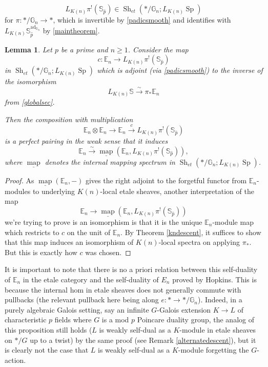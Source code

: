 \documentclass[12pt]{article}
\newtheorem{lemma}[theorem]{Lemma}
\newcommand{\on}{\operatorname}
\newcommand{\mbb}{\mathbb}
\newcommand{\wh}{\widehat}
\begin{document}
$$L_{K(n)}\pi^!(\mbb{S}_{\wh{p}}) \in \on{Sh}_{et}(\ast/\mathbb{G}_n;L_{K(n)}\on{Sp})$$
for $\pi:\ast/\mbb{G}_n\to \ast$, which is invertible by \ref{padicsmooth} and identifies with $L_{K(n)}\mbb{S}_{\wh{p}}^{\on{ad}_{\mbb{G}_n}}$ by \ref{maintheorem}.

\begin{lemma}
Let $p$ be a prime and $n\geq 1$.  Consider the map
$$c:\mathbb{E}_n\to L_{K(n)}\pi^!(\mathbb{S}_{\wh{p}})$$
in $\on{Sh}_{et}(\ast/\mathbb{G}_n;L_{K(n)}\on{Sp})$ which is adjoint (via \ref{padicsmooth}) to the inverse of the isomorphism
$$L_{K(n)}\mathbb{S}\overset{\sim}{\rightarrow} \pi_\ast\mathbb{E}_n$$
from \ref{globalsec}.

Then the composition with multiplication
$$\mathbb{E}_n\otimes\mathbb{E}_n\to\mbb{E}_n\overset{c}{\rightarrow} L_{K(n)}\pi^!(\mathbb{S}_{\wh{p}})$$
is a perfect pairing in the weak sense that it induces
$$\mathbb{E}_n\overset{\sim}{\rightarrow}\underline{\on{map}}(\mbb{E}_n,L_{K(n)}\pi^!(\mbb{S}_{\wh{p}})),$$
where $\underline{\on{map}}$ denotes the internal mapping spectrum in $\on{Sh}_{et}(\ast/\mathbb{G}_n;L_{K(n)}\on{Sp})$.
\end{lemma}
\begin{proof}
As $\underline{\on{map}}(\mbb{E}_n,-)$ gives the right adjoint to the forgetful functor from $\mathbb{E}_n$-modules to underlying $K(n)$-local etale sheaves, another interpretation of the map
$$\mbb{E}_n\rightarrow \underline{\on{map}}(\mbb{E}_n,L_{K(n)}\pi^!(\mbb{S}_{\wh{p}}))$$
we're trying to prove is an isomorphism is that it is the unique $\mathbb{E}_n$-module map which restricts to $c$ on the unit of $\mathbb{E}_n$.  By Theorem \ref{kndescent}, it suffices to show that this map induces an isomorphism of $K(n)$-local spectra on applying $\pi_\ast$.  But this is exactly how $c$ was chosen.
\end{proof}

It is important to note that there is no a priori relation between this self-duality of $\mathbb{E}_n$ in the etale category and the self-duality of $E_n$ proved by Hopkins.  This is because the internal hom in etale sheaves does not generally commute with pullbacks (the relevant pullback here being along $e:\ast\to\ast/\mbb{G}_n$).  Indeed, in a purely algebraic Galois setting, say an infinite $G$-Galois extension $K\to L$ of characteristic $p$ fields where $G$ is a mod $p$ Poincare duality group, the analog of this proposition still holds ($L$ is weakly self-dual as a $K$-module in etale sheaves on $\ast/G$ up to a twist) by the same proof (see Remark \ref{alternatedescent}), but it is clearly not the case that $L$ is weakly self-dual as a $K$-module forgetting the $G$-action.
\end{document}
